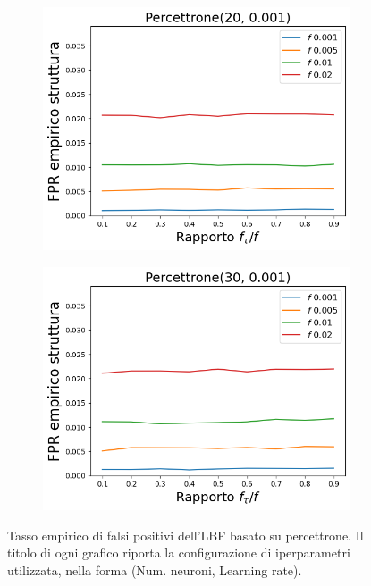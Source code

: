 \documentclass[../../main.tex]{subfiles}
\begin{document}
    \begin{figure}[H]
        \begin{subfigure}[b]{0.49\textwidth}
            \centering
            \includegraphics[width = \textwidth]{immagini/7/LBF/Percettrone(20, 0.001)_FPR.png}
            \caption{}
            \label{fig:LBFFPRPercettrone20}
        \end{subfigure}
        \begin{subfigure}[b]{0.49\textwidth}
            \centering
            \includegraphics[width = \textwidth]{immagini/7/LBF/Percettrone(30, 0.001)_FPR.png}
            \caption{}
            \label{fig:LBFFPRPercettrone30}
        \end{subfigure}
        \caption{Tasso empirico di falsi positivi dell'LBF basato su percettrone. Il titolo di ogni grafico riporta la configurazione di iperparametri utilizzata, nella forma (Num. neuroni, Learning rate).}
        \label{fig:LBFFPRPercettrone}
    \end{figure}
\end{document}
